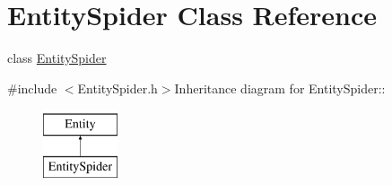 \hypertarget{classEntitySpider}{
\section{EntitySpider Class Reference}
\label{classEntitySpider}
}


class \hyperlink{classEntitySpider}{EntitySpider}  


{\ttfamily \#include $<$EntitySpider.h$>$}Inheritance diagram for EntitySpider::\begin{figure}[H]
\begin{center}
\leavevmode
\includegraphics[height=2cm]{classEntitySpider}
\end{center}
\end{figure}
